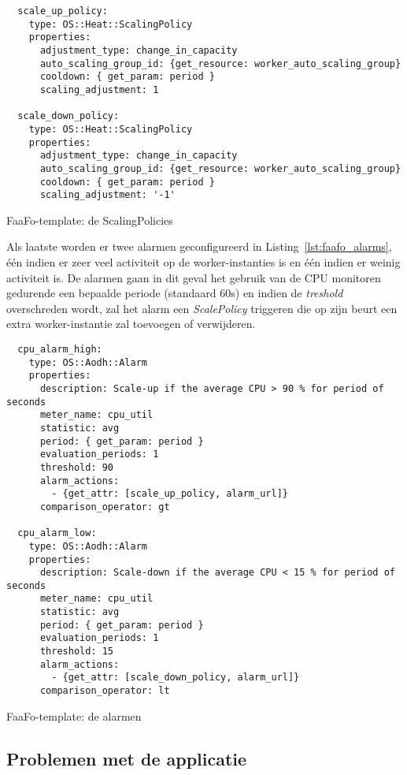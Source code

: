 \begin{code}
\begin{verbatim}
  scale_up_policy:
    type: OS::Heat::ScalingPolicy
    properties:
      adjustment_type: change_in_capacity
      auto_scaling_group_id: {get_resource: worker_auto_scaling_group}
      cooldown: { get_param: period }
      scaling_adjustment: 1

  scale_down_policy:
    type: OS::Heat::ScalingPolicy
    properties:
      adjustment_type: change_in_capacity
      auto_scaling_group_id: {get_resource: worker_auto_scaling_group}
      cooldown: { get_param: period }
      scaling_adjustment: '-1'
\end{verbatim}
\caption{FaaFo-template: de ScalingPolicies}
\label{lst:faafo_scaling_policies}
\end{code}

Als laatste worden er twee alarmen geconfigureerd in Listing~\ref{lst:faafo_alarms}, één indien er zeer veel activiteit op de worker-instanties is en één indien er weinig activiteit is. De alarmen gaan in dit geval het gebruik van de CPU monitoren gedurende een bepaalde periode (standaard 60s) en indien de \textit{treshold} overschreden wordt, zal het alarm een \textit{ScalePolicy} triggeren die op zijn beurt een extra worker-instantie zal toevoegen of verwijderen.

\begin{code}
\begin{verbatim}
  cpu_alarm_high:
    type: OS::Aodh::Alarm
    properties:
      description: Scale-up if the average CPU > 90 % for period of seconds
      meter_name: cpu_util
      statistic: avg
      period: { get_param: period }
      evaluation_periods: 1
      threshold: 90
      alarm_actions:
        - {get_attr: [scale_up_policy, alarm_url]}
      comparison_operator: gt

  cpu_alarm_low:
    type: OS::Aodh::Alarm
    properties:
      description: Scale-down if the average CPU < 15 % for period of seconds
      meter_name: cpu_util
      statistic: avg
      period: { get_param: period }
      evaluation_periods: 1
      threshold: 15
      alarm_actions:
        - {get_attr: [scale_down_policy, alarm_url]}
      comparison_operator: lt
\end{verbatim}
\caption{FaaFo-template: de alarmen}
\label{lst:faafo_alarms}
\end{code}

\subsection{Problemen met de applicatie}
\label{sec:faafoproblems}


